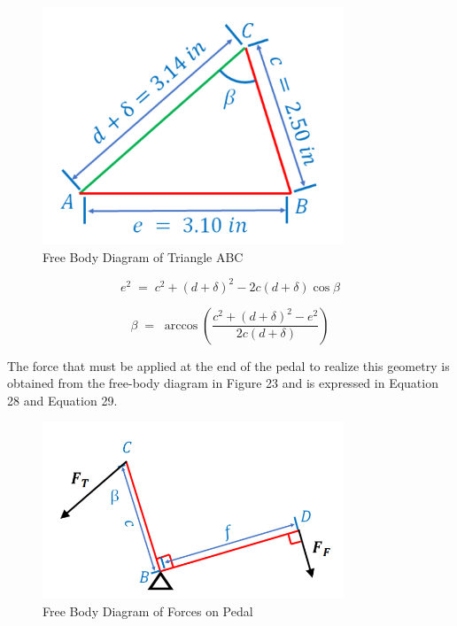 \documentclass[12pt]{article}
\theoremstyle{definition} %
\theoremstyle{plain} %
\begin{document}
\begin{figure}[htbp]
  \centering
  \includegraphics[width=0.8\textwidth]{classes/Mathematics-of-Guitar-Strings/06-10/fgs/fig22.png}
  \caption{Free Body Diagram of Triangle ABC}
  \label{fig:}
\end{figure}

\begin{equation}
  e^{2}
  \;=\;
  c^{2} + (d+\delta)^{2} - 2c(d+\delta)\cos\beta
  \tag{26}
\end{equation}

\begin{equation}
  \beta \;=\;
  \arccos\!\left(
    \frac{c^{2} + (d+\delta)^{2} - e^{2}}{\,2c(d+\delta)}
  \right)
  \tag{27}
\end{equation}

The force that must be applied at the end of the pedal to realize this
geometry is obtained from the free-body diagram in Figure 23 and is
expressed in Equation 28 and Equation 29.

\begin{figure}[htbp]
  \centering
  \includegraphics[width=0.8\textwidth]{classes/Mathematics-of-Guitar-Strings/06-10/fgs/fig23.png}
  \caption{Free Body Diagram of Forces on Pedal}
  \label{fig:}
\end{figure}
\end{document}
